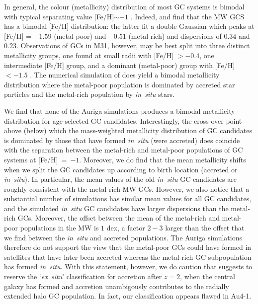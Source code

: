 \documentclass[a4paper,fleqn,usenatbib]{mnras}
\begin{document}
In general, the colour (metallicity) distribution of most GC systems is bimodal 
with typical separating value [Fe/H]$\sim -1$ \citep{1985ApJ...293..424Z,
1999AJ....118.1526G,2001AJ....121.2974L,2006ApJ...639...95P}. Indeed, 
\citet[][p. 234]{1998gcs..book.....A} and \citet[][p. 38]{Harris2001} find that
the MW GCS has a bimodal [Fe/H] distribution: the latter fit a double Gaussian 
which peaks at [Fe/H] = $-1.59$ (metal-poor) and $-0.51$ (metal-rich) and 
dispersions of $0.34$ and $0.23$. Observations of GCs in M31, however, may be
best split into three distinct metallicity groups, one found at small radii with 
[Fe/H] $>-0.4$, one intermediate [Fe/H] group, and a dominant (metal-poor) group 
with [Fe/H] $< -1.5$ \citep{2016ApJ...824...42C}. The numerical simulation of
\citet{2017MNRAS.465.3622R} does yield a bimodal metallicity distribution where
the metal-poor population is dominated by accreted star particles and the metal-rich
population by {\it in~situ} stars. 

We find that none of the Auriga simulations produces a bimodal 
metallicity distribution for age-selected GC candidates. Interestingly, the 
cross-over point above (below) which the mass-weighted metallicity distribution
of GC candidates is dominated by those that have formed {\it in~situ} (were
accreted) does coincide with the separation between the metal-rich and metal-poor
populations of GC systems at [Fe/H]~=~$-1$. Moreover, we do find that the mean
metallicity shifts when we split the GC candidates up according to birth location
(accreted or {\it in~situ}). In particular, the mean values of the old 
{\it in~situ} GC candidates are roughly consistent with the metal-rich MW GCs.
However, we also notice that a substantial number of simulations has similar 
mean values for all GC candidates, and the simulated {\it in~situ} GC candidates 
have larger dispersions than the metal-rich GCs. Moreover, the offset between 
the mean of the metal-rich and metal-poor populations in the MW is $1$ dex, a
factor $2-3$ larger than the offset that we find between the {\it in~situ} and 
accreted populations. The Auriga simulations therefore do not support the view 
that the metal-poor GCs could have formed in satellites that have later been 
accreted whereas the metal-rich GC subpopulation has formed {\it in~situ}. With 
this statement, however, we do caution that \citet{2019MNRAS.486.3134K} suggests 
to reserve the `{\it ex~situ}' classification for accretion after $z=2$, when
the central galaxy has formed and accretion unambigously contributes to the
radially extended halo GC population. In fact, our classification appears flawed
in Au4-1.
\end{document}
